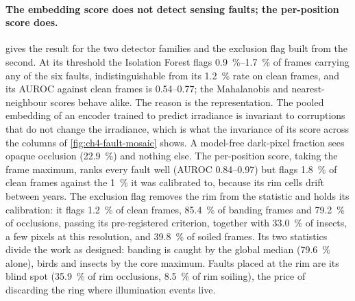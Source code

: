 \paragraph{The embedding score does not detect sensing faults; the per-position score does.}  gives the result for the two detector families and the exclusion flag built from the second. At its threshold the Isolation Forest flags \SIrange{0.9}{1.7}{\percent} of frames carrying any of the six faults, indistinguishable from its \SI{1.2}{\percent} rate on clean frames, and its AUROC against clean frames is \numrange{0.54}{0.77}; the Mahalanobis and nearest-neighbour scores behave alike. The reason is the representation. The pooled embedding of an encoder trained to predict irradiance is invariant to corruptions that do not change the irradiance, which is what the invariance of its score across the columns of \cref{fig:ch4-fault-mosaic} shows. A model-free dark-pixel fraction sees opaque occlusion (\SI{22.9}{\percent}) and nothing else. The per-position score, taking the frame maximum, ranks every fault well (AUROC \numrange{0.84}{0.97}) but flags \SI{1.8}{\percent} of clean frames against the \SI{1}{\percent} it was calibrated to, because its rim cells drift between years. The exclusion flag removes the rim from the statistic and holds its calibration: it flags \SI{1.2}{\percent} of clean frames, \SI{85.4}{\percent} of banding frames and \SI{79.2}{\percent} of occlusions, passing its pre-registered criterion, together with \SI{33.0}{\percent} of insects, a few pixels at this resolution, and \SI{39.8}{\percent} of soiled frames. Its two statistics divide the work as designed: banding is caught by the global median (\SI{79.6}{\percent} alone), birds and insects by the core maximum. Faults placed at the rim are its blind spot (\SI{35.9}{\percent} of rim occlusions, \SI{8.5}{\percent} of rim soiling), the price of discarding the ring where illumination events live.

